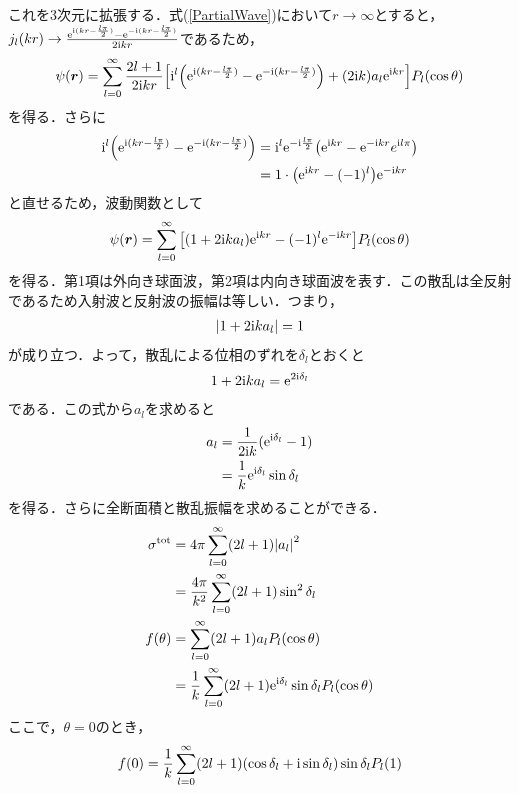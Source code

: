 \documentclass{report}
\begin{document}
  これを3次元に拡張する．式(\ref{PartialWave})において$r\to\infty$とすると，$j_l(kr)\to \frac{\mathrm{e}^{\mathrm{i}(kr - \frac{l\pi}{2})} - \mathrm{e}^{-\mathrm{i}(kr - \frac{l\pi}{2})}}{2\mathrm{i} kr}$であるため，
  \begin{align}
    \psi(\bm{r}) = \sum_{l=0}^{\infty} \frac{2l+1}{2\mathrm{i} kr}\qty[\mathrm{i}^l \qty(\mathrm{e}^{\mathrm{i}(kr - \frac{l\pi}{2})} - \mathrm{e}^{-\mathrm{i}(kr - \frac{l\pi}{2})}) + (2\mathrm{i} k) a_l \mathrm{e}^{\mathrm{i} kr}]P_l(\cos\theta)
  \end{align}
  を得る．さらに
  \begin{align}
    \mathrm{i}^l \qty(\mathrm{e}^{\mathrm{i}(kr - \frac{l\pi}{2})} - \mathrm{e}^{-\mathrm{i}(kr - \frac{l\pi}{2})}) &= \mathrm{i}^l \mathrm{e}^{-\mathrm{i}\frac{l\pi}{2}}\qty(\mathrm{e}^{\mathrm{i} kr} - \mathrm{e}^{-\mathrm{i} kr} e^{\mathrm{i} l\pi}) \\
    &= 1\cdot\qty(\mathrm{e}^{\mathrm{i} kr} - (-1)^l) \mathrm{e}^{-\mathrm{i} kr}
  \end{align}
  と直せるため，波動関数として
  \begin{align}
    \label{SCPartialWave}
    \psi(\bm{r}) = \sum_{l=0}^{\infty} \qty[(1 + 2\mathrm{i} ka_l)\mathrm{e}^{\mathrm{i} kr} - (-1)^l \mathrm{e}^{-\mathrm{i} kr}]P_l(\cos\theta)
  \end{align}
  を得る．第1項は外向き球面波，第2項は内向き球面波を表す．この散乱は全反射であるため入射波と反射波の振幅は等しい．つまり，
  \begin{align}
    \abs{1 + 2\mathrm{i} ka_l} = 1
  \end{align}
  が成り立つ．よって，散乱による位相のずれを$\delta_l$とおくと
  \begin{align}
    1 + 2\mathrm{i} ka_l = \mathrm{e}^{2\mathrm{i} \delta_l}
  \end{align}
  である．この式から$a_l$を求めると
  \begin{align}
    a_l &= \frac{1}{2\mathrm{i} k}(\mathrm{e}^{\mathrm{i} \delta_l} - 1) \\
    &= \frac{1}{k}\mathrm{e}^{\mathrm{i} \delta_l} \sin \delta_l
  \end{align}
  を得る．さらに全断面積と散乱振幅を求めることができる．
  \begin{align}
    \sigma^{\mathrm{tot}} &= 4\pi \sum_{l=0}^{\infty} (2l+1)\abs{a_l}^2 \\
    &= \frac{4\pi}{k^2} \sum_{l=0}^{\infty} (2l+1)\sin^2\delta_l \\
    f(\theta) &= \sum_{l=0}^{\infty} (2l+1)a_lP_l(\cos\theta) \\
    &= \frac{1}{k} \sum_{l=0}^{\infty}(2l+1)\mathrm{e}^{\mathrm{i}\delta_l}\sin\delta_lP_l(\cos\theta)
  \end{align}
  ここで，$\theta = 0$のとき，
  \begin{align}
    f(0) = \frac{1}{k} \sum_{l=0}^{\infty} (2l+1) (\cos\delta_l + \mathrm{i} \sin\delta_l)\sin\delta_l P_l(1)
  \end{align}
\end{document}
